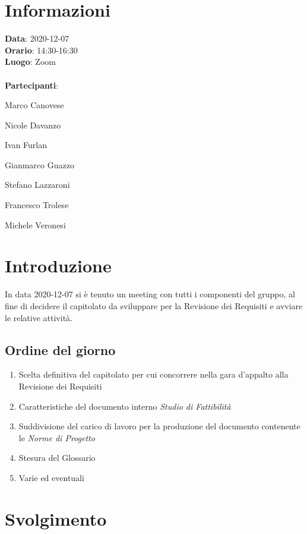\section{Informazioni}
\textbf{Data}: 2020-12-07\\
\textbf{Orario}: 14:30-16:30\\
\textbf{Luogo}: Zoom\\\\
\textbf{Partecipanti}:\begin{list}{*}{\setlength{\itemsep}{0cm}}
	\item Marco Canovese
	\item Nicole Davanzo
	\item Ivan Furlan
	\item Gianmarco Guazzo
	\item Stefano Lazzaroni
	\item Francesco Trolese
	\item Michele Veronesi
\end{list}

\section{Introduzione}
In data 2020-12-07 si è tenuto un meeting con tutti i componenti del gruppo, al fine
di decidere il capitolato da sviluppare per la Revisione dei Requisiti e avviare le relative attività.

\subsection{Ordine del giorno}
\begin{enumerate}
    \item Scelta definitiva del capitolato per cui concorrere nella gara d'appalto alla Revisione dei Requisiti
    \item Caratteristiche del documento interno \textit{Studio di Fattibilità}
    \item Suddivisione del carico di lavoro per la produzione del documento contenente le \textit{Norme di Progetto}
    \item Stesura del Glossario
    \item Varie ed eventuali
\end{enumerate}

\section{Svolgimento}
